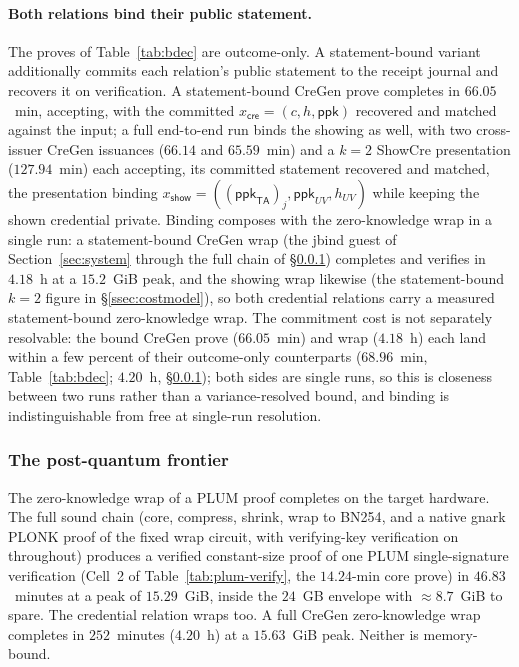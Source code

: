 \paragraph{Both relations bind their public statement.}
The proves of Table~\ref{tab:bdec} are outcome-only. A statement-bound variant additionally commits each relation's public statement to the receipt journal and recovers it on verification. A statement-bound CreGen prove completes in $66.05$~min, accepting, with the committed $x_{\mathsf{cre}}=(c,h,\mathsf{ppk})$ recovered and matched against the input; a full end-to-end run binds the showing as well, with two cross-issuer CreGen issuances ($66.14$ and $65.59$~min) and a $k{=}2$ ShowCre presentation ($127.94$~min) each accepting, its committed statement recovered and matched, the presentation binding $x_{\mathsf{show}}=((\mathsf{ppk}_{\mathsf{TA}})_j,\mathsf{ppk}_{UV},h_{UV})$ while keeping the shown credential private. Binding composes with the zero-knowledge wrap in a single run: a statement-bound CreGen wrap (the jbind guest of Section~\ref{sec:system} through the full chain of \S\ref{ssec:resource-frontier}) completes and verifies in $4.18$~h at a $15.2$~GiB peak, and the showing wrap likewise (the statement-bound $k{=}2$ figure in \S\ref{ssec:costmodel}), so both credential relations carry a measured statement-bound zero-knowledge wrap. The commitment cost is not separately resolvable: the bound CreGen prove ($66.05$~min) and wrap ($4.18$~h) each land within a few percent of their outcome-only counterparts ($68.96$~min, Table~\ref{tab:bdec}; $4.20$~h, \S\ref{ssec:resource-frontier}); both sides are single runs, so this is closeness between two runs rather than a variance-resolved bound, and binding is indistinguishable from free at single-run resolution.

\subsubsection{The post-quantum frontier}\label{ssec:resource-frontier}
The zero-knowledge wrap of a PLUM proof completes on the target hardware. The full sound chain (core, compress, shrink, wrap to {BN254}, and a native gnark {PLONK} proof of the fixed wrap circuit, with verifying-key verification on throughout) produces a verified constant-size proof of one PLUM single-signature verification (Cell~2 of Table~\ref{tab:plum-verify}, the $14.24$-min core prove) in $46.83$~minutes at a peak of $15.29$~GiB, inside the $24$~GB envelope with ${\approx}8.7$~GiB to spare. The credential relation wraps too. A full CreGen zero-knowledge wrap completes in $252$~minutes ($4.20$~h) at a $15.63$~GiB peak. Neither is memory-bound.

